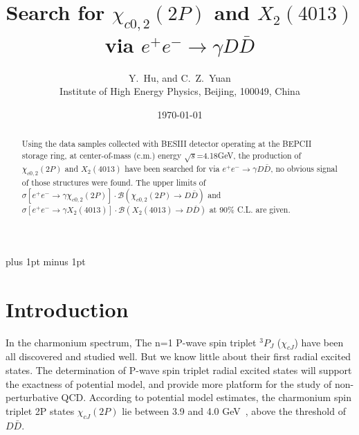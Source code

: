 \documentclass[aps,preprint,tightenlines,superscriptaddress,showpacs,byrevtex,amsmath,amssymb,nofloatfix]{revtex4}
\begin{document}
\normalsize
\parskip=5pt plus 1pt minus 1pt
\linenumbers

\graphicspath{{figure/}}


\title{\boldmath Search for $\chi_{c0,2}(2P)$ and $X_{2}(4013)$ via $e^{+}e^{-}\rightarrow \gamma D\bar{D}$}
\author{Y.~Hu, and C.~Z.~Yuan  \\
\vspace{0.2cm} \vspace{0.2cm}
Institute of High Energy Physics, Beijing, 100049, China
}
\vspace{0.2cm}
\date{\today}

\begin{abstract}
  Using the data samples collected with BESIII detector operating at the BEPCII storage ring, at center-of-mass (c.m.) energy $\sqrt{s}$=4.18GeV, the production of $\chi_{c0,2}(2P)$ and $X_{2}(4013)$ have been searched for via $e^{+}e^{-}\rightarrow \gamma D\bar{D}$, no obvious signal of those structures were found. The upper limits of  $\sigma[e^{+}e^{-}\rightarrow \gamma \chi_{c0,2}(2P)] \cdot \mathcal{B}(\chi_{c0,2}(2P) \to D\bar{D})$ and $\sigma[e^{+}e^{-}\rightarrow \gamma X_{2}(4013)] \cdot \mathcal{B}(X_{2}(4013) \to D\bar{D})$  at 90\% C.L. are given.

\end{abstract}


\maketitle

\section{Introduction}


In the charmonium spectrum, The n=1 P-wave spin triplet $^{3}P_{J}$ ($\chi_{cJ}$) have been all discovered and studied well. But we know little about their first radial excited states. The determination of P-wave spin triplet radial excited states will support the exactness of potential model, and provide more platform for the study of non-perturbative QCD. According to potential model estimates, the charmonium spin triplet 2P states $\chi_{cJ}(2P)$ lie between 3.9 and 4.0 GeV~\cite{Highercharmonia,chicJ2p_mass1,chicJ2p_mass2}, above the threshold of $D\bar{D}$.
\end{document}
